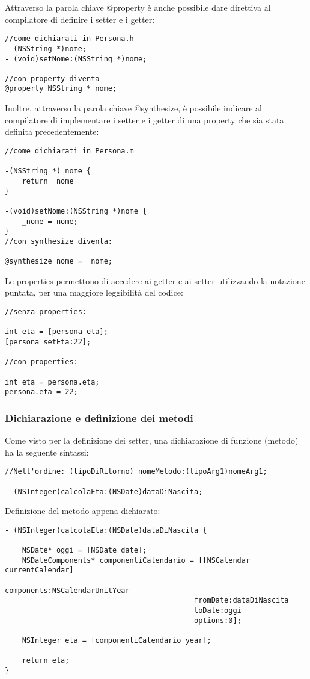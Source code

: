 \bigskip
\bigskip
\bigskip
Attraverso la parola chiave @property è anche possibile dare direttiva al compilatore di definire i setter e i getter:
\lstset{language=[Objective]C, breakindent=40pt, breaklines}
\begin{lstlisting}
//come dichiarati in Persona.h
- (NSString *)nome;
- (void)setNome:(NSString *)nome;

//con property diventa
@property NSString * nome;
\end{lstlisting}
\newpage
Inoltre, attraverso la parola chiave @synthesize, è possibile indicare al compilatore di implementare i setter e i getter di una property che sia stata definita precedentemente:
\lstset{language=[Objective]C, breakindent=40pt, breaklines}
\begin{lstlisting}
//come dichiarati in Persona.m

-(NSString *) nome {
	return _nome
}

-(void)setNome:(NSString *)nome {
	_nome = nome;
}
//con synthesize diventa:

@synthesize nome = _nome; 
\end{lstlisting}
Le properties permettono di accedere ai getter e ai setter utilizzando la notazione puntata, per una maggiore leggibilità del codice:
\lstset{language=[Objective]C, breakindent=40pt, breaklines}
\begin{lstlisting}
//senza properties: 

int eta = [persona eta]; 
[persona setEta:22]; 

//con properties: 

int eta = persona.eta;
persona.eta = 22;
\end{lstlisting}
\newpage
\subsubsection{Dichiarazione e definizione dei metodi}
Come visto per la definizione dei setter, una dichiarazione di funzione (metodo) ha la seguente sintassi: 
\lstset{language=[Objective]C, breakindent=40pt, breaklines}
\begin{lstlisting}
//Nell'ordine: (tipoDiRitorno) nomeMetodo:(tipoArg1)nomeArg1;

- (NSInteger)calcolaEta:(NSDate)dataDiNascita;
\end{lstlisting}
Definizione del metodo appena dichiarato: 
\lstset{language=[Objective]C, breakindent=40pt, breaklines}
\begin{lstlisting}
- (NSInteger)calcolaEta:(NSDate)dataDiNascita {

	NSDate* oggi = [NSDate date];
	NSDateComponents* componentiCalendario = [[NSCalendar currentCalendar] 
                                   			components:NSCalendarUnitYear 
                                   			fromDate:dataDiNascita
                                   			toDate:oggi
                                   			options:0];
	
	NSInteger eta = [componentiCalendario year];
	
	return eta;
}
\end{lstlisting}
